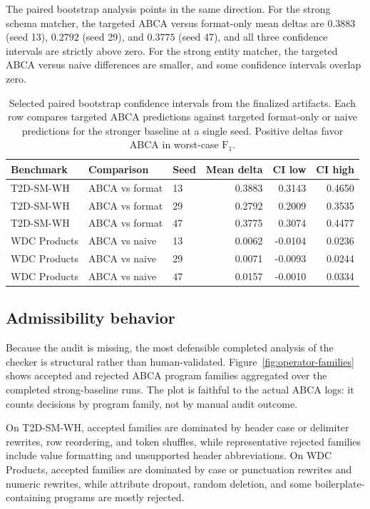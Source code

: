 \documentclass{article}
\newcommand{\abca}{\textsc{ABCA}}
\newcommand{\fonescore}{\ensuremath{\mathrm{F}_{1}}}
\begin{document}
The paired bootstrap analysis points in the same direction. For the strong schema matcher, the targeted \abca{} versus format-only mean deltas are $0.3883$ (seed 13), $0.2792$ (seed 29), and $0.3775$ (seed 47), and all three confidence intervals are strictly above zero. For the strong entity matcher, the targeted \abca{} versus naive differences are smaller, and some confidence intervals overlap zero.

\begin{table}[t]
\caption{Selected paired bootstrap confidence intervals from the finalized artifacts. Each row compares targeted \abca{} predictions against targeted format-only or naive predictions for the stronger baseline at a single seed. Positive deltas favor \abca{} in worst-case \fonescore{}.}
\label{tab:bootstrap-summary}
\centering
\small
\begin{tabular}{lllrrr}
\toprule
Benchmark & Comparison & Seed & Mean delta & CI low & CI high \\
\midrule
T2D-SM-WH & \abca{} vs format & 13 & 0.3883 & 0.3143 & 0.4650 \\
T2D-SM-WH & \abca{} vs format & 29 & 0.2792 & 0.2009 & 0.3535 \\
T2D-SM-WH & \abca{} vs format & 47 & 0.3775 & 0.3074 & 0.4477 \\
WDC Products & \abca{} vs naive & 13 & 0.0062 & -0.0104 & 0.0236 \\
WDC Products & \abca{} vs naive & 29 & 0.0071 & -0.0093 & 0.0244 \\
WDC Products & \abca{} vs naive & 47 & 0.0157 & -0.0010 & 0.0334 \\
\bottomrule
\end{tabular}
\end{table}

\subsection{Admissibility behavior}
Because the audit is missing, the most defensible completed analysis of the checker is structural rather than human-validated. Figure~\ref{fig:operator-families} shows accepted and rejected \abca{} program families aggregated over the completed strong-baseline runs. The plot is faithful to the actual ABCA logs: it counts decisions by program family, not by manual audit outcome.

On T2D-SM-WH, accepted families are dominated by header case or delimiter rewrites, row reordering, and token shuffles, while representative rejected families include value formatting and unsupported header abbreviations. On WDC Products, accepted families are dominated by case or punctuation rewrites and numeric rewrites, while attribute dropout, random deletion, and some boilerplate-containing programs are mostly rejected.
\end{document}
